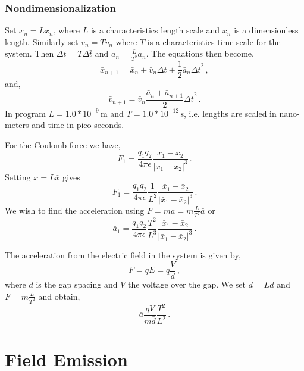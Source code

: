 \documentclass[a4paper,10pt]{article}
\begin{document}
\subsubsection{Nondimensionalization}
  Set \(x_n = L \bar{x}_n\), where \(L\) is a characteristics length scale and
  \(\bar{x}_n\) is a dimensionless length. Similarly set \(v_n = T \bar{v}_n\)
  where \(T\) is a characteristics time scale for the system.
  Then \(\Delta t = T\Delta \bar{t}\) and \(a_n = \frac{L}{T^2}\bar{a}_n\).
  The equations then become,
  \begin{equation}
    \bar{x}_{n+1} = \bar{x}_n + \bar{v}_n\Delta \bar{t} + \frac{1}{2}\bar{a}_n{\Delta \bar{t}}^2\, ,
  \end{equation}
  and,
  \begin{equation}
    \bar{v}_{n+1} = \bar{v}_n \frac{\bar{a}_n + \bar{a}_{n+1}}{2}{\Delta \bar{t}}^2\, .
  \end{equation}
  In program \(L = 1.0*10^{-9}\,\mathrm{m}\) and \(T = 1.0*10^{-12}\,\mathrm{s}\),
  i.e. lengths are scaled in nano-meters and time in pico-seconds.

  For the Coulomb force we have,
  \begin{equation}
    F_1 = \frac{q_1 q_2}{4\pi\epsilon} \frac{x_1 - x_2}{|x_1 - x_2|^3}\, .
  \end{equation}
  Setting \(x = L\bar{x}\) gives
  \begin{equation}
    F_1 = \frac{q_1 q_2}{4\pi\epsilon} \frac{1}{L^2} \frac{\bar{x}_1 - \bar{x}_2}{|\bar{x}_1 - \bar{x}_2|^3}\, .
  \end{equation}
  We wish to find the acceleration using \(F = ma = m\frac{L}{T^2}\bar{a}\) or
  \begin{equation}
    \bar{a}_1 = \frac{q_1 q_2}{4\pi\epsilon} \frac{T^2}{L^3} \frac{\bar{x}_1 - \bar{x}_2}{|\bar{x}_1 - \bar{x}_2|^3}\, .
  \end{equation}

  The acceleration from the electric field in the system is given by,
  \begin{equation}
    F = qE = q\frac{V}{d}\, ,
  \end{equation}
  where \(d\) is the gap spacing and \(V\) the voltage over the gap.
  We set \(d = L\bar{d}\) and \(F = m\frac{L}{T^2}\) and obtain,
  \begin{equation}
    \bar{a} \frac{qV}{m\bar{d}} \frac{T^2}{L^2}\, .
  \end{equation}

\section{Field Emission}
\end{document}
